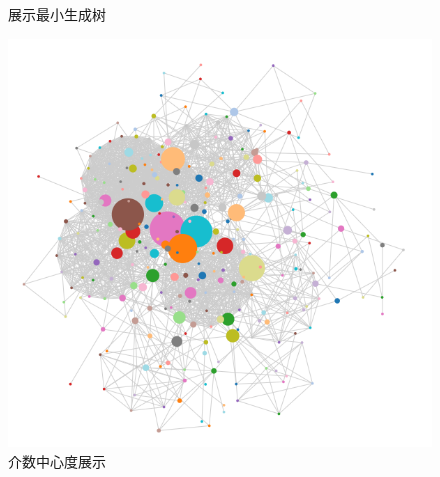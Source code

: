 \documentclass[UTF8, onecolumn, a4paper]{article}
\begin{document}
\begin{center}
\begin{figure}[ht]
\begin{minipage}[b]{\linewidth}
\begin{minipage}[b]{0.4\linewidth}
				\caption{展示最小生成树}
			\end{minipage}
		\end{minipage}
	\end{figure}
\end{center}
\begin{center}
	\begin{figure}[ht] %
		\centering %
		\begin{minipage}[b]{0.93\linewidth} %
			\begin{minipage}[b]{0.46\linewidth} %
				\centering
				\includegraphics[width=\linewidth]{../pictures/show3}
				\caption{介数中心度展示}
			\end{minipage}
			\hfill
			\begin{minipage}[b]{0.46\linewidth}
				\centering

\end{minipage}
\end{minipage}
\end{figure}
\end{center}
\end{document}
